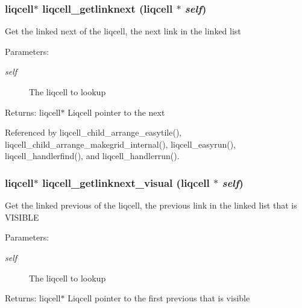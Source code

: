 \subsubsection[{liqcell\_\-getlinknext}]{\setlength{\rightskip}{0pt plus 5cm}liqcell$\ast$ liqcell\_\-getlinknext (liqcell $\ast$ {\em self})}\label{d5/da2/liqcell_8c_b321c98982c744ac08622fd06c4325f2}


Get the linked next of the liqcell, the next link in the linked list \begin{Desc}
\item[Parameters:]
\begin{description}
\item[{\em self}]The liqcell to lookup \end{description}
\end{Desc}
\begin{Desc}
\item[Returns:]liqcell$\ast$ Liqcell pointer to the next \end{Desc}


Referenced by liqcell\_\-child\_\-arrange\_\-easytile(), liqcell\_\-child\_\-arrange\_\-makegrid\_\-internal(), liqcell\_\-easyrun(), liqcell\_\-handlerfind(), and liqcell\_\-handlerrun().
\subsubsection[{liqcell\_\-getlinknext\_\-visual}]{\setlength{\rightskip}{0pt plus 5cm}liqcell$\ast$ liqcell\_\-getlinknext\_\-visual (liqcell $\ast$ {\em self})}\label{d5/da2/liqcell_8c_1a5d99c5160dbe606054ca80a934f396}


Get the linked previous of the liqcell, the previous link in the linked list that is VISIBLE \begin{Desc}
\item[Parameters:]
\begin{description}
\item[{\em self}]The liqcell to lookup \end{description}
\end{Desc}
\begin{Desc}
\item[Returns:]liqcell$\ast$ Liqcell pointer to the first previous that is visible \end{Desc}

